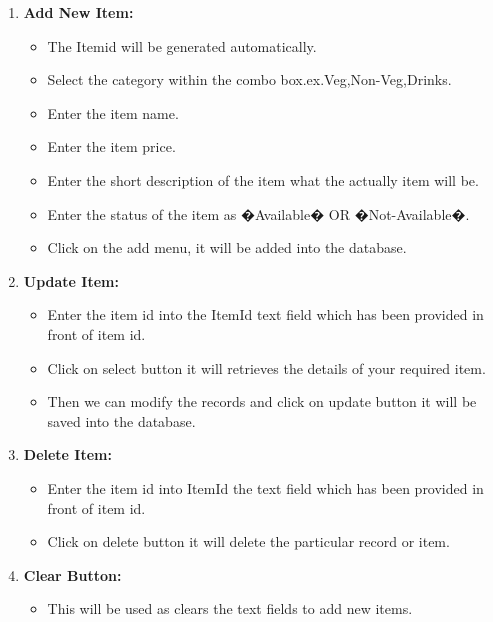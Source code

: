 \begin{enumerate}
\item {\bfseries Add New Item:}
\begin{itemize}

\item The Itemid will be generated automatically.
 \item Select the category within the combo box.ex.Veg,Non-Veg,Drinks.
 \item Enter the item name.
 \item Enter the item price.
 \item Enter the short description of the item what the actually item will be.
 \item Enter the status of the item as �Available� OR �Not-Available�.
 \item Click on the add menu, it will be added into the database.
\end{itemize}

\item {\bfseries Update Item:}

\begin{itemize}

 \item Enter the item id into the ItemId text field which has been provided in front of item id.
 \item Click on select button it will retrieves the details of your required item.
 \item Then we can modify the records and click on update button it will be saved into the database.
\end{itemize}

\item{\bfseries Delete Item:}

\begin{itemize}
\item Enter the item id into ItemId the text field which has been provided in front of item id.
 \item Click on delete button it will delete the particular record or item.
\end{itemize}

\item{\bfseries Clear Button:}
\begin{itemize}

\item This will be used as clears the text fields to add new items. 
\end{itemize}

\end{enumerate}


